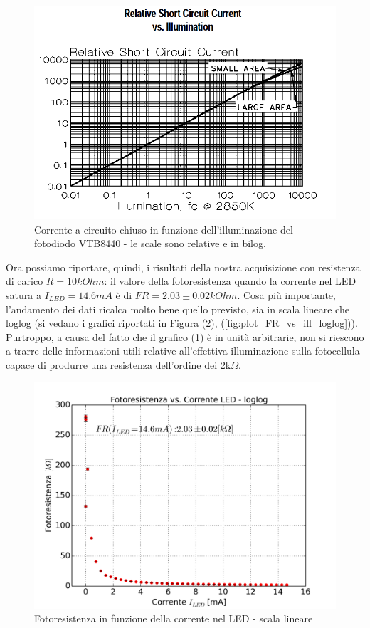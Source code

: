 \documentclass[journal, a4paper]{IEEEtran}
\begin{document}
\begin{figure}
\centering
\includegraphics[width=0.9\linewidth]{./short_current_vs_illum}
\caption{Corrente a circuito chiuso in funzione dell'illuminazione del fotodiodo VTB8440 - le scale sono relative e in bilog.}
\label{fig:short_current_vs_illum}
\end{figure}

Ora possiamo riportare, quindi, i risultati della nostra acquisizione con resistenza di carico $R = 10\si{k Ohm}$: il valore della fotoresistenza quando la corrente nel LED satura a $I_{LED} = 14.6 mA$ è di $FR = 2.03 \pm 0.02 k\si{Ohm}$. Cosa più importante, l'andamento dei dati ricalca molto bene quello previsto, sia in scala lineare che loglog (si vedano i grafici riportati in Figura (\ref{fig:plot_FR_vs_ill}), (\ref{fig:plot_FR_vs_ill_loglog})). Purtroppo, a causa del fatto che il grafico (\ref{fig:short_current_vs_illum}) è in unità arbitrarie, non si riescono a trarre delle informazioni utili relative all'effettiva illuminazione sulla fotocellula capace di produrre una resistenza dell'ordine dei 2k$\Omega$.

\begin{figure}
\centering
\includegraphics[width=0.9\linewidth]{./plot_FR_vs_ill}
\caption{Fotoresistenza in funzione della corrente nel LED - scala lineare}
\label{fig:plot_FR_vs_ill}
\end{figure}
\end{document}
